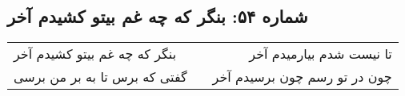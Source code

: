 \begin{center}
\section*{شماره ۵۴: بنگر که چه غم بیتو کشیدم آخر}
\label{sec:054}
\begin{longtable}{l p{0.5cm} r}
بنگر که چه غم بیتو کشیدم آخر
&&
تا نیست شدم بیارمیدم آخر
\\
گفتی که برس تا به بر من برسی
&&
چون در تو رسم چون برسیدم آخر
\\
\end{longtable}
\end{center}
